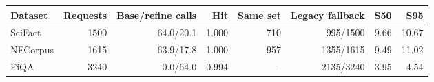 \begin{tabular}{lrrrrrrr}
\toprule
Dataset & Requests & Base/refine calls & Hit & Same set & Legacy fallback & S50 & S95\\
\midrule
SciFact & 1500 & 64.0/20.1 & 1.000 & 710 & 995/1500 & 9.66 & 10.67\\
NFCorpus & 1615 & 63.9/17.8 & 1.000 & 957 & 1355/1615 & 9.49 & 11.02\\
FiQA & 3240 & 0.0/64.0 & 0.994 & -- & 2135/3240 & 3.95 & 4.54\\
\bottomrule
\end{tabular}
